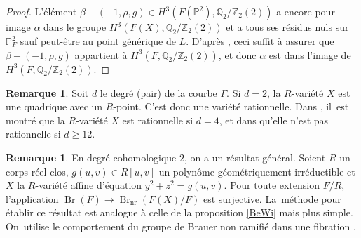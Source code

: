 \documentclass[JEP,XML,SOM,Unicode,francais,published]{cedram}
\theoremstyle{definition}
\newtheorem{rmk}[thm]{Remarque}
\newcommand{\Q}{\mathbb Q}
\newcommand{\Z}{\mathbb Z}
\renewcommand{\P}{\mathbb P}
\newcommand{\Br}{\operatorname{Br}}
\newcommand{\on}[1]{\operatorname{#1}}
\begin{document}
\begin{proof}
L'élément $\beta - (-1,\rho, g) \in H^3(F(\P^2),\Q_2/\Z_2(2))$ a encore pour image $\alpha$
dans le groupe $H^3(F(X),\Q_2/\Z_2(2))$ et a tous ses résidus nuls sur $\P^2_{F}$
sauf peut-être au point générique de $L$. D'après \cite[Prop.\,8.6, Rem.\,1.11, Rem.\,2.5]{rost1996chow}, ceci suffit à assurer
que $\beta - (-1,\rho, g)$ appartient à $H^3(F,\Q_2/\Z_2(2))$, et donc
$\alpha$ est dans l'image de $H^3(F,\Q_2/\Z_2(2))$.
\end{proof}

\begin{rmk}
Soit $d$ le degré (pair) de la courbe $\Gamma$. Si $d=2$, la $R$-variété $X$ est une quadrique avec un $R$-point. C'est donc une variété rationnelle. Dans \cite[Th.\,2.2]{benoist2026rationality}, il~est montré que la $R$-variété $X$
est rationnelle si $d=4$, et dans \cite[Th.\,4.5]{benoist2026rationality} qu'elle n'est pas rationnelle si $d\geq 12$.
\end{rmk}

\begin{rmk} En degré cohomologique $2$, on a un résultat général.
Soient $R$ un corps réel clos, $g(u,v) \in R[u,v]$ un polynôme
géométriquement irréductible et $X$ la $R$-variété affine d'équation $y^2+z^2=g(u,v)$. Pour toute extension $F/R$, l'application $\Br(F) \to \Br_{\on{nr}}(F(X)/F)$ est surjective. La~méthode pour établir ce résultat est analogue à celle de la proposition \ref{BeWi} mais plus simple. On~utilise le comportement du groupe de Brauer non ramifié dans une fibration \cite[Ch.\,11]{colliot2021brauer}.
\end{rmk}

\backmatter


\end{document}
